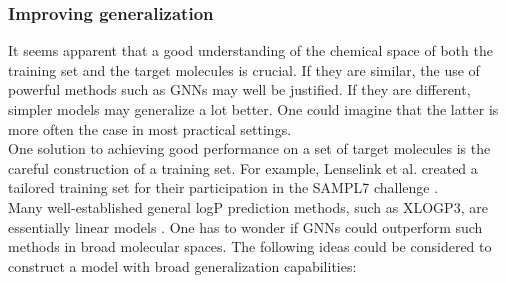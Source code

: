 \documentclass{article}
\theoremstyle{definition}
\theoremstyle{remark}
\begin{document}
\subsubsection{Improving generalization}

It seems apparent that a good understanding of the chemical space of both the training set and the target molecules is crucial. If they are similar, the use of powerful methods such as GNNs may well be justified. If they are different, simpler models may generalize a lot better. One could imagine that the latter is more often the case in most practical settings. \\

One solution to achieving good performance on a set of target molecules is the careful construction of a training set. For example, Lenselink et al. created a tailored training set for their participation in the SAMPL7 challenge \cite{lenselink2021multitask}. \\

Many well-established general logP prediction methods, such as XLOGP3, are essentially linear models \cite{cheng2007computation}. One has to wonder if GNNs could outperform such methods in broad molecular spaces. The following ideas could be considered to construct a model with broad generalization capabilities:
\end{document}
